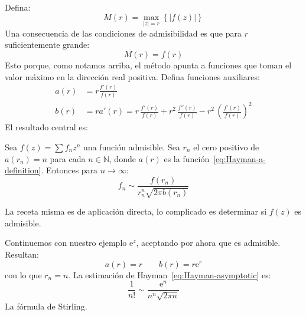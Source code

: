   Defina:
  \begin{equation}
    \label{eq:Hayman-M-definition}
    M(r)
      = \max_{\lvert z \rvert = r}
	  \left\{ \lvert f(z) \rvert \right\}
  \end{equation}
  Una consecuencia de las condiciones de admisibilidad es que
  para \(r\) suficientemente grande:
  \begin{equation}
    \label{eq:Hayman-M-value}
    M(r)
      = f(r)
  \end{equation}
  Esto porque,
  como notamos arriba,
  el método apunta a funciones que toman el valor máximo
  en la dirección real positiva.
  Defina funciones auxiliares:
  \begin{align}
    a(r)
      &= r \frac{f'(r)}{f(r)}
	 \label{eq:Hayman-a-definition} \\
    b(r)
      &= r a'(r)
       = r \, \frac{f'(r)}{f(r)}
	   + r^2 \, \frac{f''(r)}{f(r)}
	   - r^2 \, \left( \frac{f'(r)}{f(r)} \right)^2
	 \label{eq:Hayman-b-definition}
  \end{align}
  El resultado central es:
  \begin{theorem}[Hayman]
    \label{theo:Hayman}
    Sea \(f(z) = \sum f_n z^n\) una función admisible.
    Sea \(r_n\) el cero positivo de \(a(r_n) = n\)
    para cada \(n \in \mathbb{N}\),
    donde \(a(r)\) es la función~\eqref{eq:Hayman-a-definition}.
    Entonces para \(n \rightarrow \infty\):
    \begin{equation}
      \label{eq:Hayman-asymptotic}
      f_n
	\sim \frac{f(r_n)}{r_n^n \sqrt{2 \pi b(r_n)}}
    \end{equation}
  \end{theorem}
  La receta misma es de aplicación directa,
  lo complicado es determinar si \(f(z)\) es admisible.

  Continuemos con nuestro ejemplo \(\mathrm{e}^z\),
  aceptando por ahora que es admisible.
  Resultan:
  \begin{equation*}
    a(r)
      = r
    \qquad
    b(r)
      = r \mathrm{e}^r
  \end{equation*}
  con lo que \(r_n = n\).
  La estimación de Hayman~\eqref{eq:Hayman-asymptotic} es:
  \begin{equation*}
    \frac{1}{n!}
      \sim \frac{\mathrm{e}^n}{n^n \sqrt{2 \pi n}}
  \end{equation*}
  La fórmula de Stirling.%

